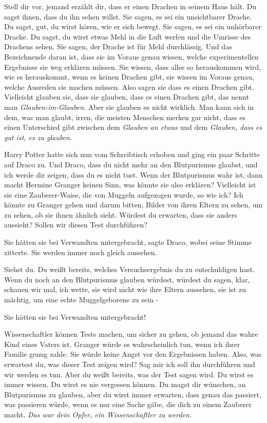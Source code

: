 Stell dir vor, jemand erzählt dir, dass er einen Drachen in seinem Haus hält. Du
sagst ihnen, dass du ihn sehen willst. Sie sagen, es sei ein unsichtbarer
Drache. Du sagst, gut, du wirst hören, wie er sich bewegt. Sie sagen, es sei ein
unhörbarer Drache. Du sagst, du wirst etwas Mehl in die Luft werfen und die
Umrisse des Drachens sehen. Sie sagen, der Drache ist für Mehl durchlässig. Und
das Bezeichnende daran ist, dass sie im Voraus genau wissen, welche
experimentellen Ergebnisse sie weg erklären müssen. Sie wissen, dass alles so
herauskommen wird, wie es herauskommt, wenn es keinen Drachen gibt, sie wissen
im Voraus genau, welche Ausreden sie machen müssen. Also sagen sie dass es einen
Drachen gibt. Vielleicht glauben sie, dass sie glauben, dass es einen Drachen
gibt, das nennt man \emph{Glauben-im-Glauben}. Aber sie glauben es nicht
wirklich. Man kann sich in dem, was man glaubt, irren, die meisten Menschen
merken gar nicht, dass es einen Unterschied gibt zwischen dem \emph{Glauben an
etwas }und dem \emph{Glauben, dass es gut ist, es zu glauben}.\grqq{}

Harry Potter hatte sich nun vom Schreibtisch erhoben und ging ein paar Schritte
auf Draco zu. \glqq Und Draco, dass du nicht mehr an den Blutpurismus glaubst,
und ich werde dir zeigen, dass du es nicht tust. Wenn der Blutpurismus wahr ist,
dann macht Hermine Granger keinen Sinn, was könnte sie also erklären? Vielleicht
ist sie eine Zauberer-Waise, die von Muggeln aufgezogen wurde, so wie ich? Ich
könnte zu Granger gehen und darum bitten, Bilder von ihren Eltern zu sehen, um
zu sehen, ob sie ihnen ähnlich sieht. Würdest du erwarten, dass sie anders
aussieht? Sollen wir diesen Test durchführen?\grqq{}

\glqq Sie hätten sie bei Verwandten untergebracht\grqq{}, sagte Draco, wobei
seine Stimme zitterte. \glqq Sie werden immer noch gleich aussehen.\grqq{}

\glqq Siehst du. Du weißt bereits, welches Versuchsergebnis du zu entschuldigen
hast. Wenn du noch an den Blutpurismus glauben würdest, würdest du sagen, klar,
schauen wir mal, ich wette, sie wird nicht wie ihre Eltern aussehen, sie ist zu
mächtig, um eine echte Muggelgeborene zu sein -\grqq{}

\glqq Sie hätten sie bei Verwandten untergebracht!\grqq{}

\glqq Wissenschaftler können Tests machen, um sicher zu gehen, ob jemand das
wahre Kind eines Vaters ist. Granger würde es wahrscheinlich tun, wenn ich ihrer
Familie genug zahle. Sie würde keine Angst vor den Ergebnissen haben. Also, was
erwartest du, was dieser Test zeigen wird? Sag mir ich soll ihn durchführen und
wir werden es tun. Aber du weißt bereits, was der Test sagen wird. Du wirst es
immer wissen. Du wirst es nie vergessen können. Du magst dir wünschen, an
Blutpurismus zu glauben, aber du wirst immer erwarten, dass genau das passiert,
was passieren würde, wenn es nur eine Sache gäbe, die dich zu einem Zauberer
macht. \emph{ Das war dein Opfer, ein Wissenschaftler zu werden.}\grqq{}

